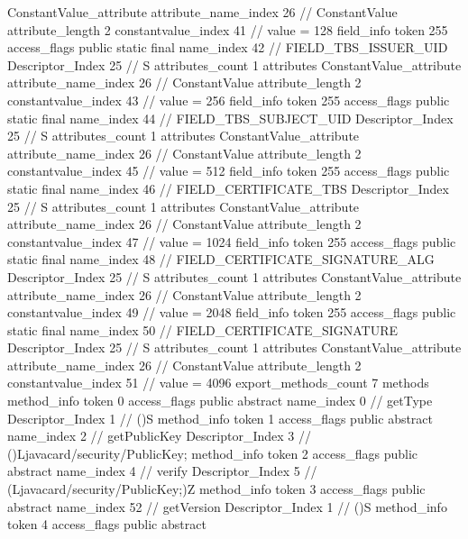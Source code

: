 {{{{{{				ConstantValue_attribute {
					attribute_name_index	26		// ConstantValue
					attribute_length	2
					constantvalue_index	41		// value = 128
				}
				}
			}
			field_info {
				token	255
				access_flags	public static final
				name_index	42		// FIELD_TBS_ISSUER_UID
				Descriptor_Index	25		// S
				attributes_count	1
				attributes {
				ConstantValue_attribute {
					attribute_name_index	26		// ConstantValue
					attribute_length	2
					constantvalue_index	43		// value = 256
				}
				}
			}
			field_info {
				token	255
				access_flags	public static final
				name_index	44		// FIELD_TBS_SUBJECT_UID
				Descriptor_Index	25		// S
				attributes_count	1
				attributes {
				ConstantValue_attribute {
					attribute_name_index	26		// ConstantValue
					attribute_length	2
					constantvalue_index	45		// value = 512
				}
				}
			}
			field_info {
				token	255
				access_flags	public static final
				name_index	46		// FIELD_CERTIFICATE_TBS
				Descriptor_Index	25		// S
				attributes_count	1
				attributes {
				ConstantValue_attribute {
					attribute_name_index	26		// ConstantValue
					attribute_length	2
					constantvalue_index	47		// value = 1024
				}
				}
			}
			field_info {
				token	255
				access_flags	public static final
				name_index	48		// FIELD_CERTIFICATE_SIGNATURE_ALG
				Descriptor_Index	25		// S
				attributes_count	1
				attributes {
				ConstantValue_attribute {
					attribute_name_index	26		// ConstantValue
					attribute_length	2
					constantvalue_index	49		// value = 2048
				}
				}
			}
			field_info {
				token	255
				access_flags	public static final
				name_index	50		// FIELD_CERTIFICATE_SIGNATURE
				Descriptor_Index	25		// S
				attributes_count	1
				attributes {
				ConstantValue_attribute {
					attribute_name_index	26		// ConstantValue
					attribute_length	2
					constantvalue_index	51		// value = 4096
				}
				}
			}
			}
			export_methods_count	7
			methods {
				method_info {
					token	0
					access_flags	public abstract
					name_index	0		// getType
					Descriptor_Index	1		// ()S
				}
				method_info {
					token	1
					access_flags	public abstract
					name_index	2		// getPublicKey
					Descriptor_Index	3		// ()Ljavacard/security/PublicKey;
				}
				method_info {
					token	2
					access_flags	public abstract
					name_index	4		// verify
					Descriptor_Index	5		// (Ljavacard/security/PublicKey;)Z
				}
				method_info {
					token	3
					access_flags	public abstract
					name_index	52		// getVersion
					Descriptor_Index	1		// ()S
				}
				method_info {
					token	4
					access_flags	public abstract
}}}}}
